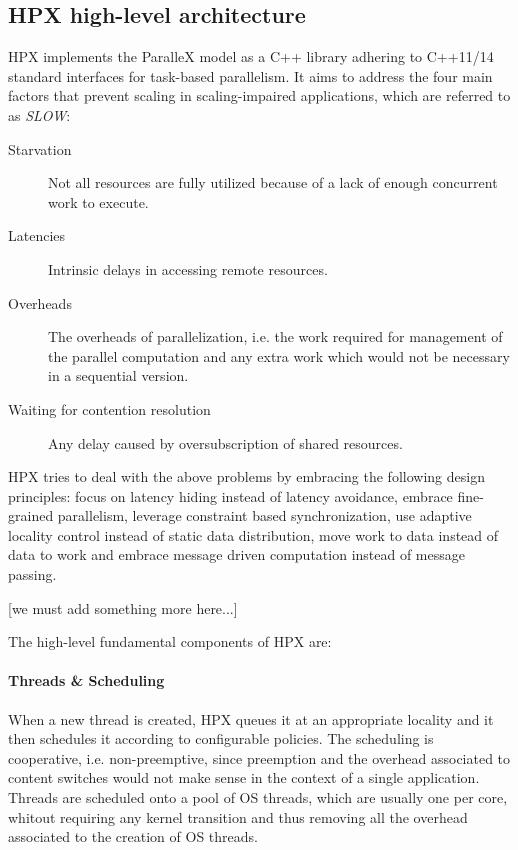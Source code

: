 \subsection{HPX high-level architecture}
HPX implements the ParalleX model as a C++ library adhering to C++11/14 standard interfaces for task-based parallelism.
It aims to address the four main factors that prevent scaling in scaling-impaired applications, which are referred to as \emph{SLOW}\cite{kaiser2014hpx}:
\begin{description}
	\item [Starvation] Not all resources are fully utilized because of a lack of enough concurrent work to execute.
	\item [Latencies] Intrinsic delays in accessing remote resources.
	\item [Overheads] The overheads of parallelization, i.e. the work required for management of the parallel computation and any extra work which would not be necessary in a sequential version.
	\item [Waiting for contention resolution] Any delay caused by oversubscription of shared resources.
\end{description}

HPX tries to deal with the above problems by embracing the following design principles: focus on latency hiding instead of latency avoidance, embrace fine-grained parallelism, leverage constraint based synchronization, use adaptive locality control instead of static data distribution, move work to data instead of data to work and embrace message driven computation instead of message passing.\cite{kaiser2014hpx}

[\TODO we must add something more here...]

The high-level fundamental components of HPX are:

\paragraph{Threads \& Scheduling}
When a new thread is created, HPX queues it at an appropriate locality and it then schedules it according to configurable policies. The scheduling is cooperative, i.e. non-preemptive, since preemption and the overhead associated to content switches would not make sense in the context of a single application. Threads are scheduled onto a pool of OS threads, which are usually one per core, whitout requiring any kernel transition and thus removing all the overhead associated to the creation of OS threads.

